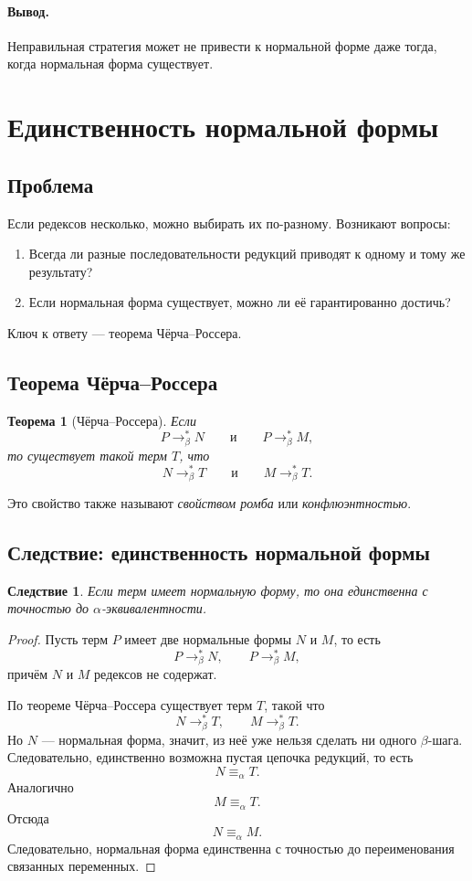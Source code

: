 \documentclass[12pt,a4paper]{article}
\newtheorem{theorem}{Теорема}
\newtheorem{corollary}{Следствие}
\theoremstyle{remark}
\begin{document}
\paragraph{Вывод.}
Неправильная стратегия может не привести к нормальной форме даже тогда, когда нормальная форма существует.

\section{Единственность нормальной формы}

\subsection{Проблема}

Если редексов несколько, можно выбирать их по-разному. Возникают вопросы:

\begin{enumerate}
    \item Всегда ли разные последовательности редукций приводят к одному и тому же результату?
    \item Если нормальная форма существует, можно ли её гарантированно достичь?
\end{enumerate}

Ключ к ответу --- теорема Чёрча--Россера.

\subsection{Теорема Чёрча--Россера}

\begin{theorem}[Чёрча--Россера]
Если
\[
P \to_\beta^* N
\qquad\text{и}\qquad
P \to_\beta^* M,
\]
то существует такой терм $T$, что
\[
N \to_\beta^* T
\qquad\text{и}\qquad
M \to_\beta^* T.
\]
\end{theorem}

Это свойство также называют \emph{свойством ромба} или \emph{конфлюэнтностью}.

\subsection{Следствие: единственность нормальной формы}

\begin{corollary}
Если терм имеет нормальную форму, то она единственна с точностью до $\alpha$-эквивалентности.
\end{corollary}

\begin{proof}
Пусть терм $P$ имеет две нормальные формы $N$ и $M$, то есть
\[
P \to_\beta^* N,
\qquad
P \to_\beta^* M,
\]
причём $N$ и $M$ редексов не содержат.

По теореме Чёрча--Россера существует терм $T$, такой что
\[
N \to_\beta^* T,
\qquad
M \to_\beta^* T.
\]
Но $N$ --- нормальная форма, значит, из неё уже нельзя сделать ни одного $\beta$-шага. Следовательно, единственно возможна пустая цепочка редукций, то есть
\[
N \equiv_\alpha T.
\]
Аналогично
\[
M \equiv_\alpha T.
\]
Отсюда
\[
N \equiv_\alpha M.
\]
Следовательно, нормальная форма единственна с точностью до переименования связанных переменных.
\end{proof}
\end{document}
